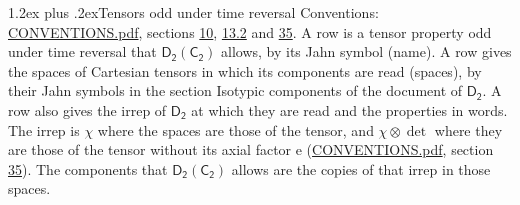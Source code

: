 \documentclass[10pt,a4paper]{article}
\makeatletter
\renewcommand\section{\@startsection{section}{1}{\z@}{-3ex plus -1ex minus -.2ex}%
  {1.2ex plus .2ex}{\normalfont\large\sffamily\bfseries\color{parttitle}}}
\numberwithin{equation}{section}
\newcommand{\grp}[1]{\mathsf{#1}}
\newcommand{\irrprod}{\otimes}
\makeatother
\begin{document}
\section{Tensors odd under time reversal}\label{s:time_odd}
Conventions: \href{../../CONVENTIONS.pdf}{CONVENTIONS.pdf}, sections \href{../../../rotation/CONVENTIONS.pdf\#conv.10}{10}, \href{../../../rotation/CONVENTIONS.pdf\#conv.13.2}{13.2} and \href{../../CONVENTIONS.pdf\#conv.35}{35}.
\leavevmode\label{n:head.name.property}A row is a tensor property odd under time reversal that $\grp{D_{2}}(\grp{C_{2}})$ allows, by its Jahn symbol (name). \label{n:head.spaces}A row gives the spaces of Cartesian tensors in which its components are read (spaces), by their Jahn symbols in the section Isotypic components of the document of \href{../../../rotation/data/pdf/D2.pdf}{$\grp{D_{2}}$}. \label{n:head.properties}A row also gives the irrep of $\grp{D_{2}}$ at which they are read and the properties in words. The irrep is $\chi$ where the spaces are those of the tensor, and $\chi \irrprod \det$ where they are those of the tensor without its axial factor e (\href{../../CONVENTIONS.pdf}{CONVENTIONS.pdf}, section \href{../../CONVENTIONS.pdf\#conv.35}{35}). The components that $\grp{D_{2}}(\grp{C_{2}})$ allows are the copies of that irrep in those spaces.
\end{document}
